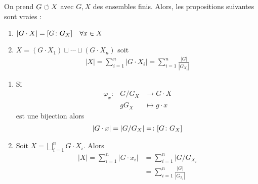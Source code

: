 \documentclass[french,a4paper,10pt]{article}
\begin{document}
	\begin{corollaire}
		On prend $G\circlearrowleft X$ avec $G,X$ des ensembles finis. Alors, les propositions suivantes sont vraies :
			\begin{enumerate}[label=$(\roman*)$]
				\item $|{G\cdot X}|=\mathopen{[}G\colon G_X\mathclose{]}\quad\forall x\in X$
				\item $X=(G\cdot X_1)\sqcup\cdots\sqcup (G\cdot X_n)$ soit
					\[\begin{aligned}
						|X| = \sum_{i=1}^n|{G\cdot X_i}|=\sum_{i=1}^n\frac{| G|}{|{G_{X_i}}|}
					\end{aligned}\]
			\end{enumerate}
	\end{corollaire}
	\begin{myproof}
		\begin{enumerate}[label=$(\roman*)$]
			\item Si 
				\[\begin{aligned}
					\varphi_x\colon &G/G_X&\to G\cdot X\\
					&gG_X&\mapsto g\cdot x
				\end{aligned}\] est une bijection alors
			\[\begin{aligned}
				|G\cdot x|=|G/G_X|=\colon\mathopen{[}G\colon G_X\mathclose{]}
			\end{aligned}\]
			\item Soit $X=\bigsqcup_{i=1}^n G\cdot X_i$. Alors
				\[\begin{aligned}
					|X|=\sum_{i=1}^n|G\cdot x_i|&=\sum_{i=1}^n|G/G_{X_i}\\
					&=\sum_{i=1}^n\frac{|G|}{|G_{x_i}|}
				\end{aligned}\]
		\end{enumerate}
		
	\end{myproof}
\end{document}

